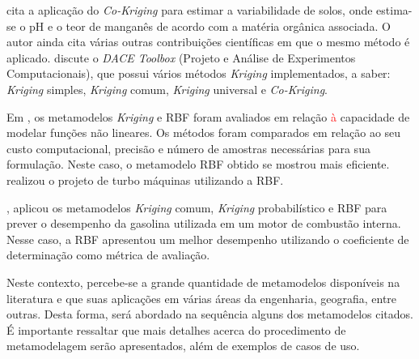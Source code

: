  cita a aplicação do \textit{Co-Kriging} para estimar a variabilidade de solos, onde estima-se o pH e o teor de manganês de acordo com a matéria orgânica associada. O autor ainda cita várias outras contribuições científicas em que o mesmo método é aplicado.  discute o \textit{DACE Toolbox} (Projeto e Análise de Experimentos Computacionais), que possui vários métodos {\it Kriging} implementados, a saber: {\it Kriging} simples, {\it Kriging} comum, {\it Kriging} universal e \textit{Co-Kriging}.

Em , os metamodelos {\it Kriging} e RBF foram avaliados em relação \textcolor{red}{à} capacidade de modelar funções não lineares. Os métodos foram comparados em relação ao seu custo computacional, precisão e número de amostras necessárias para sua formulação. Neste caso, o metamodelo RBF obtido se mostrou mais eficiente.  realizou o projeto de turbo máquinas utilizando a RBF.

, aplicou os metamodelos {\it Kriging} comum, {\it Kriging} probabilístico e RBF para prever o desempenho da gasolina utilizada em um motor de combustão interna. Nesse caso, a RBF apresentou um melhor desempenho utilizando o coeficiente de determinação como métrica de avaliação.

Neste contexto, percebe-se a grande quantidade de metamodelos disponíveis na literatura e que suas aplicações em várias áreas da engenharia, geografia, entre outras. Desta forma, será abordado na sequência alguns dos metamodelos citados. É importante ressaltar que mais detalhes acerca do procedimento de metamodelagem serão apresentados, além de exemplos de casos de uso.
